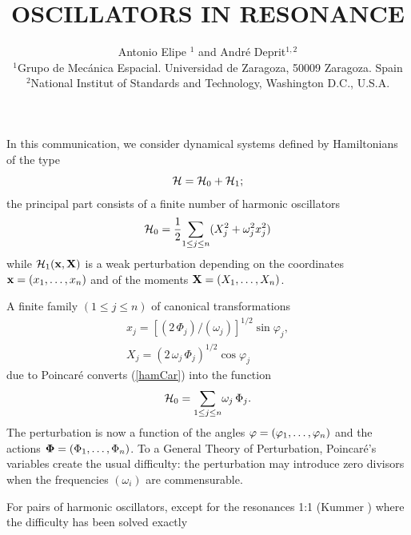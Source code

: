 

\title{OSCILLATORS IN RESONANCE}
\author{
 Antonio Elipe ${}^1$ and
Andr\'e Deprit${}^{1,2}$  \\
{\small
${}^{1}$Grupo de Mec\'anica Espacial. Universidad de Zaragoza,
50009 Zaragoza. Spain}\\
{\small
${}^{2}$National Institut of Standards and Technology,
Washington D.C., U.S.A. }
 }
 \date{}
\pagestyle{empty}

\maketitle

In this communication, we  consider dynamical systems defined by
Hamiltonians of the type
\[
{\cal H} = {\cal H}_0 + {\cal H}_1;
\] the principal part consists of a finite number of harmonic
oscillators
\begin{equation}\label{hamCar} {\cal H}_0 = \frac{1}{2}{\displaystyle
\sum _{1\le j \le n}} (X_j^2 + \omega_j^2 x_j^2)
\end{equation} while ${\cal H}_1 ({\mbox{$\bf x$}}, {\mbox{$\bf X$}})$
is a weak perturbation depending on the coordinates
${\mbox{$\bf x$}}= (x_1,\ldots,x_n)$ and of the moments ${\mbox{$\bf
X$}}= (X_1,\ldots,X_n)$.
\par A finite family $(1\le j\le n)$ of canonical transformations
\begin{equation}\label{Poincare}
\begin{array}{l} x_j = [(2 \, \Phi_j)/(\omega _j)]^{1/2} \sin
\varphi_j , \\[1.5ex]
	X_j = (2 \, \omega _j\, \Phi_j)^{1/2} \cos \varphi_j
\end{array}
\end{equation} due to Poincar\'e converts  (\ref{hamCar}) into the
function
\begin{equation}\label{hamPoin} {\cal H}_0 =  {\displaystyle
\sum_{1\le j \le n} }\omega_j\, \Phi_j .
\end{equation} The perturbation is now a function of the angles
${\mbox{$\bf \varphi$}}= (\varphi_1,\ldots,\varphi_n)$ and the actions
${\mbox{$\bf \Phi$}}= (\Phi_1,\ldots,\Phi_n)$.  To a General Theory of
Perturbation, Poincar\'e's variables create the usual difficulty: the
perturbation may introduce zero divisors when the frequencies
$(\omega_i)$ are commensurable.
\par For pairs of harmonic oscillators, except for the resonances 1:1
(Kummer \cite{Kummer}) where the difficulty has been solved exactly
